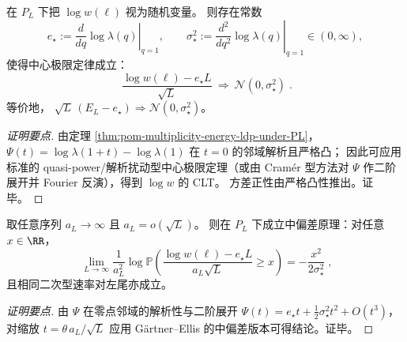 \begin{theorem}\label{thm:pom-multiplicity-logw-clt}
在 \(P_L\) 下把 \(\log w(\boldsymbol{\ell})\) 视为随机变量。
则存在常数
\[
e_\star:=\left.\frac{d}{dq}\log\lambda(q)\right|_{q=1},
\qquad
\sigma_\star^2:=\left.\frac{d^2}{dq^2}\log\lambda(q)\right|_{q=1}\in(0,\infty),
\]
使得中心极限定律成立：
\[
\boxed{\;
\frac{\log w(\boldsymbol{\ell})-e_\star L}{\sqrt{L}}\ \Longrightarrow\ \mathcal{N}(0,\sigma_\star^2)\; } .
\]
等价地，
\(
\sqrt{L}\,(E_L-e_\star)\Longrightarrow \mathcal{N}(0,\sigma_\star^2)
\)。
\end{theorem}
\begin{proof}[证明要点]
由定理 \ref{thm:pom-multiplicity-energy-ldp-under-PL}，\(\Psi(t)=\log\lambda(1+t)-\log\lambda(1)\) 在 \(t=0\) 的邻域解析且严格凸；
因此可应用标准的 quasi-power/解析扰动型中心极限定理（或由 Cramér 型方法对 \(\Psi\) 作二阶展开并 Fourier 反演），得到 \(\log w\) 的 CLT。
方差正性由严格凸性推出。证毕。
\end{proof}

\begin{proposition}\label{prop:pom-multiplicity-logw-mdp}
取任意序列 \(a_L\to\infty\) 且 \(a_L=o(\sqrt{L})\)。
则在 \(P_L\) 下成立中偏差原理：对任意 \(x\in\RR\)，
\[
\boxed{\;
\lim_{L\to\infty}\frac{1}{a_L^2}\log
\mathbb{P}\!\left(\frac{\log w(\boldsymbol{\ell})-e_\star L}{a_L\sqrt{L}}\ge x\right)
=-\frac{x^2}{2\sigma_\star^2}\; } ,
\]
且相同二次型速率对左尾亦成立。
\end{proposition}
\begin{proof}[证明要点]
由 \(\Psi\) 在零点邻域的解析性与二阶展开 \(\Psi(t)=e_\star t+\frac12\sigma_\star^2 t^2+O(t^3)\)，对缩放 \(t=\theta\,a_L/\sqrt{L}\) 应用 G\"artner--Ellis 的中偏差版本可得结论。证毕。
\end{proof}

